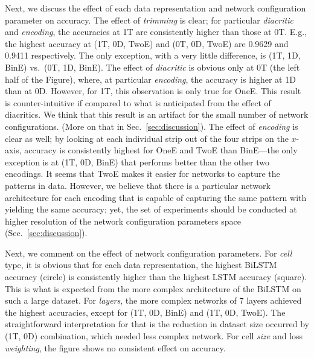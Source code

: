 Next, we discuss the effect of each data representation and network configuration parameter on
accuracy. The effect of \textit{trimming} is clear; for particular \textit{diacritic} and
\textit{encoding}, the accuracies at 1T are consistently higher than those at 0T. E.g., the highest
accuracy at (1T, 0D, TwoE) and (0T, 0D, TwoE) are 0.9629 and 0.9411 respectively. The only
exception, with a very little difference, is (1T, 1D, BinE) vs.\ (0T, 1D, BinE). The effect of
\textit{diacritic} is obvious only at 0T (the left half of the Figure), where, at particular
\textit{encoding}, the accuracy is higher at 1D than at 0D. However, for 1T, this observation is
only true for OneE. This result is counter-intuitive if compared to what is anticipated from the
effect of diacritics. We think that this result is an artifact for the small number of network
configurations. (More on that in Sec.~\ref{sec:discussion}). The effect of \textit{encoding} is
clear as well; by looking at each individual strip out of the four strips on the $x$-axis, accuracy
is consistently highest for OneE and TwoE than BinE---the only exception is at (1T, 0D, BinE) that
performs better than the other two encodings. It seems that TwoE makes it easier for networks to
capture the patterns in data. However, we believe that there is a particular network architecture
for each encoding that is capable of capturing the same pattern with yielding the same accuracy; yet,
the set of experiments should be conducted at higher resolution of the network configuration
parameters space (Sec.~\ref{sec:discussion}).

Next, we comment on the effect of network configuration parameters. For \textit{cell} type, it is
obvious that for each data representation, the highest BiLSTM accuracy (circle) is consistently higher
than the highest LSTM accuracy (square). This is what is expected from the more complex architecture of
the BiLSTM on such a large dataset. For \textit{layers}, the more complex networks of 7 layers
achieved the highest accuracies, except for (1T, 0D, BinE) and (1T, 0D, TwoE). The straightforward
interpretation for that is the reduction in dataset size occurred by (1T, 0D) combination, which
needed less complex network. For cell \textit{size} and loss \textit{weighting}, the figure shows no
consistent effect on accuracy.

\bigskip

